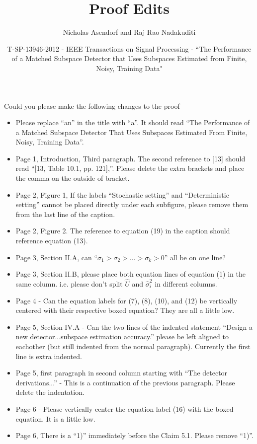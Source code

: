 \documentclass[11pt]{article}
\title{Proof Edits}
\author{Nicholas Asendorf and Raj Rao Nadakuditi}
\date{T-SP-13946-2012 - IEEE Transactions on Signal Processing - ``The Performance of a Matched Subspace Detector that Uses Subspaces Estimated from Finite, Noisy, Training Data"}
\begin{document}
\maketitle


Could you please make the following changes to the proof
\begin{itemize}
  \item Please replace ``an'' in the title with ``a''. It should read ``The Performance of
    a Matched Subspace Detector That Uses Subspaces Estimated From Finite, Noisy, Training
    Data''.
  \item Page 1, Introduction, Third paragraph. The second reference to [13] should read
    ``[13, Table 10.1, pp. 121],''. Please delete the extra brackets and place the comma
    on the outside of bracket.
  \item Page 2, Figure 1, If the labels ``Stochastic setting'' and ``Deterministic
    setting'' cannot be placed directly under each subfigure, please remove them from
    the last line of the caption.
  \item Page 2, Figure 2. The reference to equation (19) in the caption should reference
    equation (13).
  \item Page 3, Section II.A, can ``$\sigma_1>\sigma_2>\dots>\sigma_k>0$'' all be on one
    line?
  \item Page 3, Section II.B, please place both equation lines of equation (1) in the same
    column. i.e. please don't split $\widehat{U}$ and $\widehat{\sigma}_i^2$ in different
    columns.
  \item Page 4 - Can the equation labels for (7), (8), (10), and (12) be vertically centered with
    their respective boxed equation? They are all a little low.
  \item Page 5, Section IV.A - Can the two lines of the indented statement ``Design a new
    detector...subspace estimation accuracy.'' please be left aligned to eachother (but
    still indented from the normal paragraph). Currently the first line is extra indented.
  \item Page 5, first paragraph in second column starting with ``The detector
    derivations...'' - This is a continuation of the previous paragraph. Please delete the
    indentation.
  \item Page 6 - Please vertically center the equation label (16) with the boxed
    equation. It is a little low.
  \item Page 6, There is a ``1)'' immediately before the Claim 5.1. Please remove ``1)''.

\end{itemize}
\end{document}
